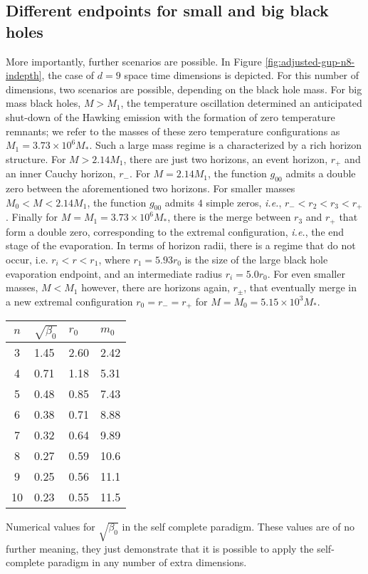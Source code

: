 \subsection*{Different endpoints for small and big black holes}
More importantly, further scenarios are possible. In Figure \ref{fig:adjusted-gup-n8-indepth},
the case of $d=9$ space time dimensions is depicted. For this number of dimensions, two scenarios are
possible, depending on the black hole mass. For big mass black holes, $M>M_1$, the temperature oscillation determined an anticipated shut-down of the Hawking emission with the formation of zero temperature remnants; we refer to the masses of these zero temperature configurations as $M_1 = 3.73 \times 10^6 M_*$.
Such a large mass regime is a characterized by a rich horizon structure. For $M>2.14 M_1$, there are just two horizons, an event horizon, $r_+$ and an inner Cauchy horizon, $r_-$. For $M=2.14 M_1$, the function $g_{00}$ admits a double zero between the aforementioned two horizons. For smaller masses  $M_0<M<2.14 M_1$, the function $g_{00}$ admits $4$ simple zeros, \textit{i.e.}, $r_-<r_2<r_3<r_+$. Finally for $M=M_1=3.73 \times 10^6 M_*$, there is the merge between $r_3$ and $r_+$ that form a double zero, corresponding to the extremal configuration, \textit{i.e.}, the end stage of the evaporation.
In terms of horizon radii, there is a regime that do not occur, i.e. $r_i < r < r_1$, where $r_1 =5.93r_0$ is the
size of the large black hole evaporation endpoint, and an intermediate radius $r_i=5.0r_0$.
For even smaller masses, $M<M_1$ however, there are horizons again, $r_\pm$, that eventually merge in a new extremal configuration $r_0=r_-=r_+$ for $M=M_0=5.15 \times 10^3 M_*$.

\begin{margintable}
	\centering
	\begin{tabular}{clll}
		\toprule
		{$n$} & $\sqrt{\beta_0}$ & $r_0$ & $m_0$ \\
		\midrule
		{3}        & 1.45         & 2.60      & 2.42\\
		{4}        & 0.71         & 1.18      & 5.31\\
		{5}        & 0.48         & 0.85      & 7.43\\
		{6}        & 0.38         & 0.71      & 8.88\\
		{7}        & 0.32         & 0.64      & 9.89\\
		{8}        & 0.27         & 0.59      & 10.6\\
		{9}        & 0.25         & 0.56      & 11.1\\
		{10}       & 0.23         & 0.55      & 11.5 \\
		\bottomrule
	\end{tabular}
	\caption[Self-completeness values for the adjusted GUP]{
		Numerical values for $\sqrt{\beta_0}$ in the self complete
		paradigm. These values are of no further meaning,
		they just demonstrate that it is possible to apply the
		self-complete paradigm in any number of extra dimensions.
	}\label{table:self-completeness-adjusted-gup}
\end{margintable}


